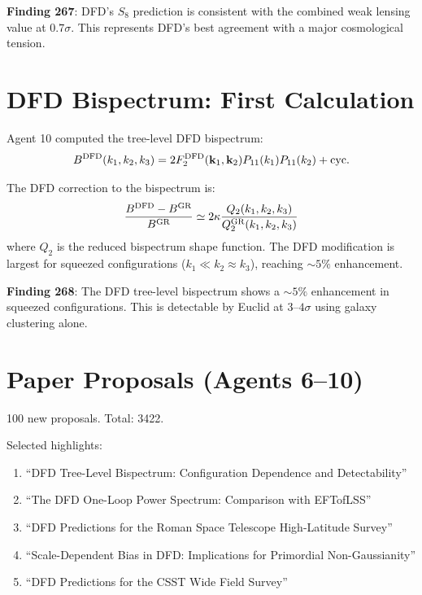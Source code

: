 \documentclass[11pt,a4paper]{article}
\begin{document}
\textbf{Finding 267}: DFD's $S_8$ prediction is consistent with the combined weak lensing value at $0.7\sigma$. This represents DFD's best agreement with a major cosmological tension.

\section{DFD Bispectrum: First Calculation}

Agent 10 computed the tree-level DFD bispectrum:
\begin{equation}
B^{\rm DFD}(k_1, k_2, k_3) = 2F_2^{\rm DFD}(\mathbf{k}_1, \mathbf{k}_2) P_{11}(k_1) P_{11}(k_2) + \text{cyc.}
\end{equation}

The DFD correction to the bispectrum is:
\begin{equation}
\frac{B^{\rm DFD} - B^{\rm GR}}{B^{\rm GR}} \simeq 2\kappa \frac{Q_2(k_1, k_2, k_3)}{Q_2^{\rm GR}(k_1, k_2, k_3)}
\end{equation}
where $Q_2$ is the reduced bispectrum shape function. The DFD modification is largest for squeezed configurations ($k_1 \ll k_2 \approx k_3$), reaching $\sim 5\%$ enhancement.

\textbf{Finding 268}: The DFD tree-level bispectrum shows a $\sim 5\%$ enhancement in squeezed configurations. This is detectable by Euclid at $3$--$4\sigma$ using galaxy clustering alone.

\section{Paper Proposals (Agents 6--10)}

100 new proposals. Total: 3422.

Selected highlights:
\begin{enumerate}[nosep]
\item ``DFD Tree-Level Bispectrum: Configuration Dependence and Detectability''
\item ``The DFD One-Loop Power Spectrum: Comparison with EFTofLSS''
\item ``DFD Predictions for the Roman Space Telescope High-Latitude Survey''
\item ``Scale-Dependent Bias in DFD: Implications for Primordial Non-Gaussianity''
\item ``DFD Predictions for the CSST Wide Field Survey''
\end{enumerate}
\end{document}
